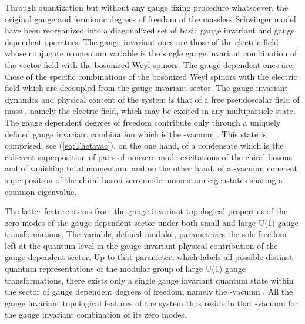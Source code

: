 \documentclass[a4paper,11pt]{article}
\def\Z{\mathbb Z}
\begin{document}
Through quantization but without any gauge fixing procedure
whatsoever, the original gauge and fermionic degrees of freedom of the massless
Schwinger model have been reorganized into a diagonalized set of basic gauge 
in\-va\-riant and gauge dependent operators. The gauge invariant ones are
those of the electric field whose conjugate momentum variable is the single 
gauge in\-va\-riant combination of the vector field \coordHE{} with the bosonized 
Weyl spinors. The gauge dependent ones are those of the specific combinations 
of the bosonized Weyl spinors with the electric field which are decoupled from 
the gauge invariant sector. The gauge invariant dynamics and physical 
content of the system is that of a free pseudoscalar field of mass 
\coordHE{}, namely the electric field, which may be excited in 
any multiparticle state. The gauge dependent degrees of freedom contribute
only through a uniquely defined gauge in\-va\-riant combination which is the
\myHighlight{$\theta$}\coordHE{}-vacuum \myHighlight{$|\Omega_\theta>$}\coordHE{}. This state is comprised, 
see (\ref{eq:Thetavac}), on the one hand,
of a condensate which is the coherent superposition of pairs of nonzero mode 
excitations of the chiral bosons \coordHE{} and \coordHE{} of vanishing 
total momentum, and on the other hand, of a \myHighlight{$\theta$}\coordHE{}-vacuum coherent
superposition of the chiral boson zero mode momentum eigenstates sharing
a common eigenvalue. 

The latter feature stems from the gauge invariant
topological properties of the zero modes of the gauge dependent sector
under both small and large U(1) gauge transformations. The \myHighlight{$\theta$}\coordHE{} variable,
defined modulo \myHighlight{$2\pi$}\coordHE{}, parametrizes the sole freedom left at the quantum
level in the gauge invariant physical contribution of the gauge dependent
sector. Up to that parameter, which labels all possible distinct quantum
representations of the modular group \myHighlight{$\Z$}\coordHE{} of large U(1) gauge transformations, 
there exists only a single gauge in\-va\-riant quantum state within the sector 
of gauge dependent degrees of freedom, namely the \myHighlight{$\theta$}\coordHE{}-vacuum 
\myHighlight{$|\Omega_\theta>$}\coordHE{}. All the gauge invariant topological features of the system 
thus reside in that \myHighlight{$\theta$}\coordHE{}-vacuum for the gauge invariant combination of 
its zero modes.
\end{document}
